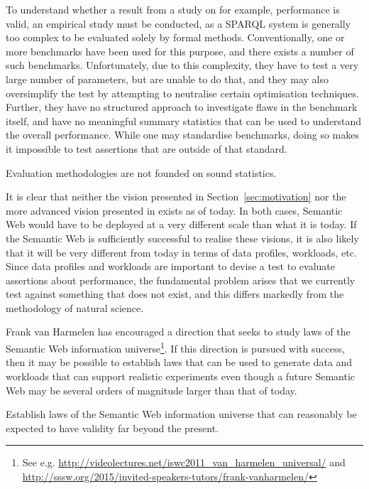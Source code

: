 To understand whether a result from a study on for example, performance is
valid, an empirical study must be conducted, as a SPARQL system is
generally too complex to be evaluated solely by formal
methods. Conventionally, one or more benchmarks have been used for
this purpose, and there exists a number of such
benchmarks. Unfortunately, due to this complexity, they have to test a
very large number of parameters, but are unable to do that, and they
may also oversimplify the test by attempting to neutralise certain
optimisation techniques. Further, they have no structured approach to
investigate flaws in the benchmark itself, and have no meaningful
summary statistics that can be used to understand the overall
performance. While one may standardise benchmarks, doing so makes it
impossible to test assertions that are outside of that standard. 

\begin{problem}\label{prob:badstats}
Evaluation methodologies are not founded on sound statistics.
\end{problem}

It is clear that neither the vision presented in
Section~\ref{sec:motivation} nor the more advanced vision presented in
\cite{berners2001semantic} exists as of today. In both cases, Semantic
Web would have to be deployed at a very different scale than what it
is today. If the Semantic Web is sufficiently successful to realise
these visions, it is also likely that it will be very different from
today in terms of data profiles, workloads, etc. Since data profiles
and workloads are important to devise a test to evaluate assertions
about performance, the fundamental problem arises that we currently
test against something that does not exist, and this differs markedly
from the methodology of natural science.

Frank van Harmelen has encouraged a direction that seeks to study laws
of the Semantic Web information universe\footnote{See
  e.g. \url{http://videolectures.net/iswc2011_van_harmelen_universal/}
  and
  \url{http://sssw.org/2015/invited-speakers-tutors/frank-vanharmelen/}}.
If this direction is pursued with success, then it may be possible to
establish laws that can be used to generate data and workloads that
can support realistic experiments even though a future Semantic Web
may be several orders of magnitude larger than that of today.


\begin{problem}\label{prob:lawsfuture}
Establish laws of the Semantic Web information universe that can reasonably be
expected to have validity far beyond the present.
\end{problem}

